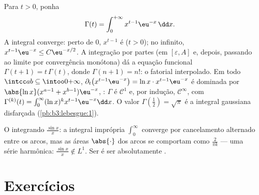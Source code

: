 \begin{example}\label{ex:b3:lebesgue:gamma}
Para $t > 0$, ponha
\[
\Gamma(t) = \int_0^{+\infty} x^{t-1}\eu^{-x}\,\dd x .
\]
A integral converge: perto de $0$, $x^{t-1}$ é  ($t >
0$);
no infinito, $x^{t-1}\eu^{-x} \leq C\eu^{-x/2}$. A integração por partes (em $[\varepsilon, A]$ e, depois,
passando ao limite por convergência monótona) dá a equação funcional
$\Gamma(t + 1) =
t\,\Gamma(t)$, donde $\Gamma(n+1) = n!$: o fatorial interpolado. Em todo $\intcc ab \subseteq \intoo0{+\infty}$, $\partial_t\bigl(x^{t-1}\eu^{-x}\bigr) = \ln
x\cdot x^{t-1}\eu^{-x}$ é
dominada por $\abs{\ln x}(x^{a-1} +
x^{b-1})\eu^{-x}$, : $\Gamma$ é $\mathcal C^1$ e, por indução,
$\mathcal C^\infty$, com $\Gamma^{(k)}(t) =
\int_0^\infty(\ln x)^kx^{t-1}\eu^{-x}\dd x$. O valor $\Gamma(\frac12) = \sqrt\pi$ é a integral gaussiana disfarçada
(\cref{pb:b3:lebesgue:1}).
\end{example}

\begin{omfigure}

{\small O integrando $\frac{\sin x}x$: a integral imprópria $\int_0^\infty$ converge por
cancelamento alternado entre os arcos, mas as áreas $\abs{\cdot}$ dos arcos se
comportam como $\frac2{\pi k}$ --- uma série harmônica: $\frac{\sin x}x
\notin L^1$. Ser
 é ser absolutamente .}
\end{omfigure}

\section{Exercícios}

